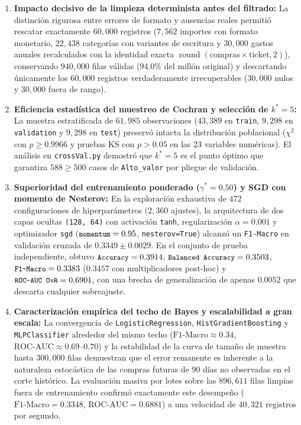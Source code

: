 \documentclass[11pt,a4paper]{article}
\newcommand{\code}[1]{\texttt{\small #1}}
\begin{document}
\begin{enumerate}
    \item \textbf{Impacto decisivo de la limpieza determinista antes del filtrado:} La distinción rigurosa entre errores de formato y ausencias reales permitió rescatar exactamente $60{,}000$ registros ($7{,}562$ importes con formato monetario, $22{,}438$ categorías con variantes de escritura y $30{,}000$ gastos anuales recalculados con la identidad exacta $\operatorname{round}(\text{compras} \times \text{ticket}, 2)$), conservando $940{,}000$ filas válidas ($94.0\%$ del millón original) y descartando únicamente los $60{,}000$ registros verdaderamente irrecuperables ($30{,}000$ nulos y $30{,}000$ fuera de rango).
    \item \textbf{Eficiencia estadística del muestreo de Cochran y selección de $k^* = 5$:} La muestra estratificada de $61{,}985$ observaciones ($43{,}389$ en \code{train}, $9{,}298$ en \code{validation} y $9{,}298$ en \code{test}) preservó intacta la distribución poblacional ($\chi^2$ con $p \ge 0.9966$ y pruebas KS con $p > 0.05$ en las 23 variables numéricas). El análisis en \code{crossVal.py} demostró que $k^* = 5$ es el punto óptimo que garantiza $588 \ge 500$ casos de \code{Alto\_valor} por pliegue de validación.
    \item \textbf{Superioridad del entrenamiento ponderado ($\gamma^* = 0.50$) y SGD con momento de Nesterov:} En la exploración exhaustiva de $472$ configuraciones de hiperparámetros ($2{,}360$ ajustes), la arquitectura de dos capas ocultas \code{(128, 64)} con activación \code{tanh}, regularización $\alpha = 0.001$ y optimizador \code{sgd} ($\text{\code{momentum}} = 0.95$, \code{nesterov=True}) alcanzó un \code{F1-Macro} en validación cruzada de $0.3349 \pm 0.0029$. En el conjunto de prueba independiente, obtuvo $\text{\code{Accuracy}} = 0.3914$, $\text{\code{Balanced Accuracy}} = 0.3503$, $\text{\code{F1-Macro}} = 0.3383$ ($0.3457$ con multiplicadores post-hoc) y $\text{\code{ROC-AUC OvR}} = 0.6901$, con una brecha de generalización de apenas $0.0052$ que descarta cualquier sobreajuste.
    \item \textbf{Caracterización empírica del techo de Bayes y escalabilidad a gran escala:} La convergencia de \code{LogisticRegression}, \code{HistGradientBoosting} y \code{MLPClassifier} alrededor del mismo techo ($\text{F1-Macro} \approx 0.34$, $\text{ROC-AUC} \approx 0.69\text{--}0.70$) y la estabilidad de la curva de tamaño de muestra hasta $300{,}000$ filas demuestran que el error remanente es inherente a la naturaleza estocástica de las compras futuras de 90 días no observadas en el corte histórico. La evaluación masiva por lotes sobre las $896{,}611$ filas limpias fuera de entrenamiento confirmó exactamente este desempeño ($\text{F1-Macro} = 0.3348$, $\text{ROC-AUC} = 0.6881$) a una velocidad de $40{,}321$ registros por segundo.
\end{enumerate}
\end{document}
